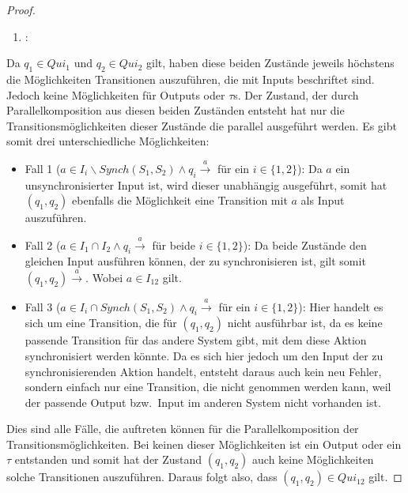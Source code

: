 \begin{proof}
  ~
  \begin{enumerate}
    \item \hspace{-0.2cm}:
  \end{enumerate}
  \vspace{-0.3cm}
  Da $q_1\in Qui_1$ und $q_2\in Qui_2$ gilt, haben
  diese beiden Zustände jeweils höchstens die Möglichkeiten Transitionen
  auszuführen, die mit Inputs beschriftet sind. Jedoch keine Möglichkeiten für
  Outputs oder $\tau$s. Der Zustand, der durch Parallelkomposition aus diesen
  beiden Zuständen entsteht hat nur die Transitionsmöglichkeiten dieser
  Zustände die parallel ausgeführt werden. Es gibt somit drei unterschiedliche
  Möglichkeiten:
  \begin{itemize}
    \item Fall 1 ($a\in I_i\backslash Synch(S_1,S_2)\wedge q_i
      \overset{a}{\rightarrow}$ für ein $i\in \{1,2\}$): Da $a$ ein
      unsynchronisierter Input ist, wird dieser unabhängig ausgeführt, somit hat
      $(q_1,q_2)$ ebenfalls die Möglichkeit eine Transition mit $a$ als Input
      auszuführen.
    \item Fall 2 ($a\in I_1\cap I_2\wedge q_i \overset{a}{\rightarrow}$ für
      beide $i\in \{1,2\}$): Da beide Zustände den gleichen Input ausführen
      können, der zu synchronisieren ist, gilt somit $(q_1,q_2)
      \overset{a}{\rightarrow}$. Wobei $a\in I_{12}$ gilt.
    \item Fall 3 ($a\in I_i\cap Synch(S_1,S_2)\wedge q_i
      \overset{a}{\rightarrow}$ für ein $i\in \{1,2\}$): Hier handelt es sich
      um eine Transition, die für $(q_1,q_2)$ nicht ausführbar ist, da es keine
      passende Transition für das andere System gibt, mit dem diese Aktion
      synchronisiert werden könnte. Da es sich hier jedoch um den Input der zu
      synchronisierenden Aktion handelt, entsteht daraus auch kein
      neu Fehler, sondern einfach nur eine Transition, die nicht
      genommen werden kann, weil der passende Output bzw.\ Input im anderen
      System nicht vorhanden ist.
  \end{itemize}
  Dies sind alle Fälle, die auftreten können für die Parallelkomposition der
  Transitionsmöglichkeiten. Bei keinen dieser Möglichkeiten ist ein Output oder
  ein $\tau$ entstanden und somit hat der Zustand $(q_1,q_2)$ auch keine
  Möglichkeiten solche Transitionen auszuführen. Daraus folgt also, dass
  $(q_1,q_2)\in Qui_{12}$ gilt.


\end{proof}
